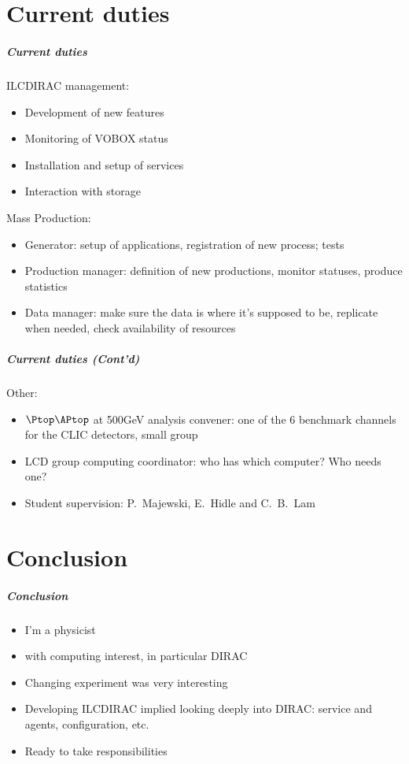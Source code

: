\documentclass{beamer}
\begin{document}
\part{Current duties}
\begin{frame}
\partpage
\end{frame}
\begin{frame}
\frametitle{Current duties}
ILCDIRAC management:
\begin{itemize}
  \item Development of \alert{new features}
  \item \alert{Monitoring} of VOBOX status
  \item {\color{blue}Installation and setup} of services
  \item Interaction with storage
\end{itemize}
Mass Production:
\begin{itemize}
  \item Generator: setup of applications, registration of new process; tests
  \item \alert{Production manager}: definition of new productions, monitor
  statuses, produce statistics
  \item Data manager: make sure the data is where it's supposed to be, replicate
  when needed, check availability of resources
\end{itemize}
\end{frame}

\begin{frame}
\frametitle{Current duties (Cont'd)}
Other:
\begin{itemize}
  \item $\Ptop\APtop$ at 500GeV analysis convener: one of the 6 benchmark
  channels for the CLIC detectors, small group
  \item LCD group computing coordinator: who has which computer? Who needs one?
  \item Student supervision: P.~Majewski, E.~Hidle and C.~B.~Lam
\end{itemize}
\end{frame}
 
\part{Conclusion}
\begin{frame}
\partpage
\end{frame}
\begin{frame}
\frametitle{Conclusion} 
\begin{itemize}
  \item \alert{I'm a physicist}\pause
  \item with {\color{blue}computing interest}, in particular \alert{DIRAC}\pause
  \item Changing experiment was very interesting\pause
  \item Developing ILCDIRAC implied \alert{looking deeply into DIRAC}: service
  and agents, configuration, etc.\pause
  \item Ready to take responsibilities
\end{itemize}
\end{frame}
\end{document}
